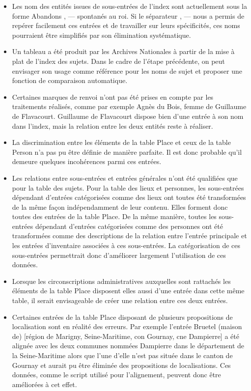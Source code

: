 \documentclass[a4paper,12pt,twoside]{book}
\begin{document}
	\begin{itemize}
		\item Les nom des entités issues de sous-entrées de l'index sont actuellement sous la forme \og Abandons , — spontanés au roi\fg{}. Si le séparateur \og  , — \fg{} nous a permis de repérer facilement ces entrées et de travailler sur leurs spécificités, ces noms pourraient être simplifiés par son élimination systématique.
		
		\item Un tableau a été produit par les Archives Nationales à partir de la mise à plat de l'index des sujets. Dans le cadre de l'étape précédente, on peut envisager son usage comme référence pour les noms de sujet et proposer une fonction de comparaison automatique.
		
		\item Certaines marques de renvoi n'ont pas été prises en compte par les traitements réalisés, comme par exemple \og Agnès du Bois, femme de Guillaume de Flavacourt\fg{}. Guillaume de Flavacourt dispose bien d'une entrée à son nom dans l'index, mais la relation entre les deux entités reste à réaliser.
		
		\item La discrimination entre les éléments de la table Place et ceux de la table Person n'a pas pu être définie de manière parfaite. Il est donc probable qu'il demeure quelques incohérences parmi ces entrées.
		
		\item Les relations entre sous-entrées et entrées générales n'ont été qualifiées que pour la table des sujets. Pour la table des lieux et personnes, les sous-entrées dépendant d'entrées catégorisées comme des lieux ont toutes été transformées de la même façon indépendamment de leur contenu. Elles forment donc toutes des entrées de la table Place. De la même manière, toutes les sous-entrées dépendant d'entrées catégorisées comme des personnes ont été transformées comme des descriptions de la relation entre l'entrée principale et les entrées d'inventaire associées à ces sous-entrées. La catégorisation de ces sous-entrées permettrait donc d'améliorer largement l'utilisation de ces données.
		
		\item Lorsque les circonscriptions administratives auxquelles sont rattachés les éléments de la table Place disposent elles aussi d'une entrée dans cette même table, il serait envisageable de créer une relation entre ces deux entrées.
		
		\item Certaines entrées de la table Place disposant de plusieurs propositions de localisation sont en réalité des erreurs. Par exemple l'entrée \og Bruetel (maison de) [région de Marigny, Seine-Maritime, con Gournay, cne Dampierre]\fg{} a été alignée avec les deux communes nommées Dampierre dans le département de la Seine-Maritime alors que l'une d'elle n'est pas située dans le canton de Gournay et aurait pu être éliminée des propositions de localisations. Ces données, comme le script utilisé pour l'alignement, peuvent donc être améliorées à cet effet.
		

\end{itemize}
\end{document}
